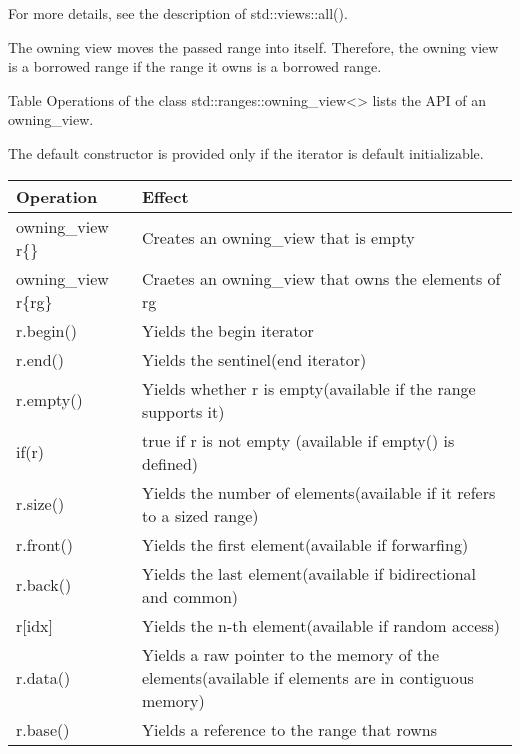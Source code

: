 For more details, see the description of std::views::all().



The owning view moves the passed range into itself. Therefore, the owning view is a borrowed range if the range it owns is a borrowed range.


Table Operations of the class std::ranges::owning\_view<> lists the API of an owning\_view.

The default constructor is provided only if the iterator is default initializable.

\begin{longtable}[c]{|l|l|}
\hline
\textbf{Operation}   & \textbf{Effect}                                                \\ \hline
\endfirsthead
%
\endhead
%
owning\_view r\{\}   & Creates an owning\_view that is empty                          \\ \hline
owning\_view r\{rg\} & Craetes an owning\_view that owns the elements of rg           \\ \hline
r.begin()            & Yields the begin iterator                                      \\ \hline
r.end()              & Yields the sentinel(end iterator)                              \\ \hline
r.empty()            & Yields whether r is empty(available if the range supports it)  \\ \hline
if(r)                & true if r is not empty (available if empty() is defined)       \\ \hline
r.size() & Yields the number of elements(available if it refers to a sized range)                             \\ \hline
r.front()            & Yields the first element(available if forwarfing)              \\ \hline
r.back()             & Yields the last element(available if bidirectional and common) \\ \hline
r{[}idx{]}           & Yields the n-th element(available if random access)            \\ \hline
r.data() & Yields a raw pointer to the memory of the elements(available if elements are in contiguous memory) \\ \hline
r.base()             & Yields a reference to the range that rowns                    \\ \hline
\end{longtable}

